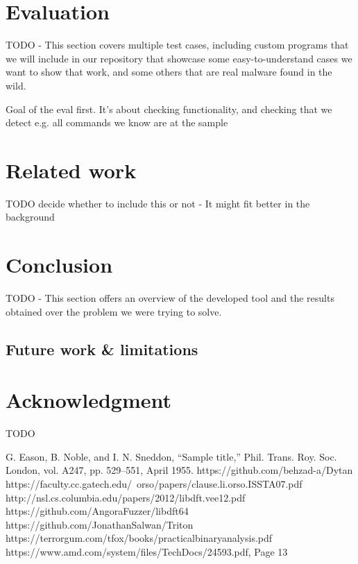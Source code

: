 \documentclass[conference]{IEEEtran}
\begin{document}
\section{Evaluation}
TODO - This section covers multiple test cases, including custom programs that
we will include in our repository that showcase some easy-to-understand cases
we want to show that work, and some others that are real malware found in the
wild.

Goal of the eval first. It's about checking functionality, and checking that we
detect e.g. all commands we know are at the sample

\section{Related work}
TODO decide whether to include this or not - It might fit better in the
background

\section{Conclusion}
TODO - This section offers an overview of the developed tool and the results
obtained over the problem we were trying to solve.

\subsection{Future work \& limitations}

\section*{Acknowledgment}
TODO

\begin{thebibliography}{00}
     G. Eason, B. Noble, and I. N. Sneddon, ``Sample title,'' Phil. Trans. Roy. Soc. London, vol. A247, pp. 529--551, April 1955.
     https://github.com/behzad-a/Dytan
     https://faculty.cc.gatech.edu/~orso/papers/clause.li.orso.ISSTA07.pdf
     http://nsl.cs.columbia.edu/papers/2012/libdft.vee12.pdf
     https://github.com/AngoraFuzzer/libdft64
     https://github.com/JonathanSalwan/Triton
     https://terrorgum.com/tfox/books/practicalbinaryanalysis.pdf
     https://www.amd.com/system/files/TechDocs/24593.pdf, Page 13

\end{thebibliography}
\vspace{12pt}
\end{document}
